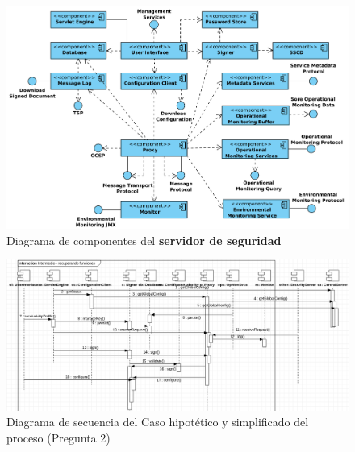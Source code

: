 \begin{figure}[h!]
    \centering
    \includegraphics[scale=0.5]{Pictures/arc-ss_security_server_component_diagram.png}
    \caption{Diagrama de componentes del \textbf{servidor de seguridad}}
    \label{fig:SSDC}
\end{figure}

\begin{figure}
    \centering
    \includegraphics[width=\textwidth]{Pictures/xroad.png}
    \caption{Diagrama de secuencia del Caso hipotético y simplificado del proceso (Pregunta 2)}
    \label{fig:xroad}
\end{figure}